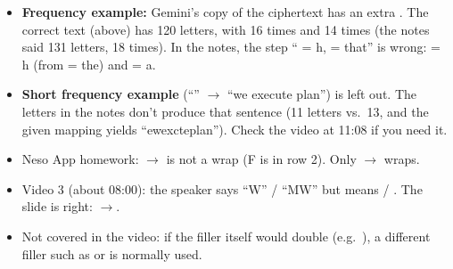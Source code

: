 \begin{fixbox}
\begin{itemize}
  \item \textbf{Frequency example:} Gemini's copy of the ciphertext has an extra . The correct text (above) has 120 letters, with  16 times and  14 times (the notes said 131 letters,  18 times). In the notes, the step `` = h,  = that'' is wrong:  = h (from  = the) and  = a.
  \item \textbf{Short frequency example} (``'' $\to$ ``we execute plan'') is left out. The letters in the notes don't produce that sentence (11 letters vs.\ 13, and the given mapping yields ``ewexcteplan''). Check the video at 11:08 if you need it.
  \item Neso App homework: $\to$ is not a wrap (F is in row 2). Only $\to$ wraps.
  \item Video 3 (about 08:00): the speaker says ``W'' / ``MW'' but means  / . The slide is right: $\to$.
  \item Not covered in the video: if the filler itself would double (e.g.\ ), a different filler such as  or  is normally used.
\end{itemize}
\end{fixbox}
